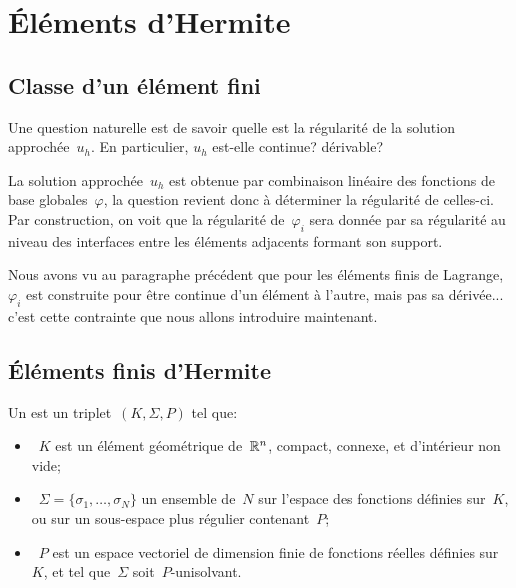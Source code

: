 \medskip
\section{Éléments d'Hermite}

\medskip
\subsection{Classe d'un élément fini}

Une question naturelle est de savoir quelle est la régularité de la solution approchée~$u_h$. En particulier, $u_h$ est-elle continue? dérivable?

La solution approchée~$u_h$ est obtenue par combinaison linéaire des fonctions de base globales~$\varphi$, la question revient donc à déterminer la régularité de celles-ci. Par construction, on voit que la régularité de~$\varphi_i$ sera donnée par sa régularité au niveau des interfaces entre les éléments adjacents formant son support.

Nous avons vu au paragraphe précédent que pour les éléments finis de Lagrange, $\varphi_i$ est construite pour être continue d'un élément à l'autre, mais pas sa dérivée... c'est cette contrainte que nous allons introduire maintenant.


\medskip
\subsection{Éléments finis d'Hermite}

\begin{definition}
Un  est un triplet~$(K, \Sigma, P)$ tel que:
\begin{itemize}
\item~$K$ est un élément géométrique de~$\mathbb R^n$, compact, connexe, et d'intérieur non vide;
\item~$\Sigma=\{\sigma_1,\ldots, \sigma_N\}$ un ensemble de~$N$  sur l'espace des fonctions définies sur~$K$, ou sur un sous-espace plus régulier contenant~$P$;
\item~$P$ est un espace vectoriel de dimension finie de fonctions réelles définies sur~$K$, et tel que~$\Sigma$ soit~$P$-unisolvant.
\end{itemize}
\end{definition}

